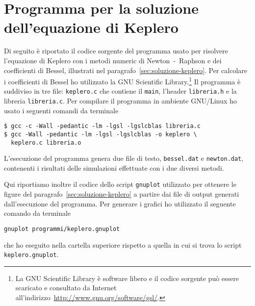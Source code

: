 \chapter{Programma per la soluzione dell'equazione di Keplero}
\label{cha:soluzione-keplero}

Di seguito è riportato il codice sorgente del programma usato per risolvere
l'equazione di Keplero con i metodi numeric di Newton~-~Raphson e dei
coefficienti di Bessel, illustrati nel
paragrafo~\ref{sec:soluzione-keplero}. Per calcolare i coefficienti di Bessel ho
utilizzato la GNU Scientific Library.\footnote{La GNU Scientific Library è
  software libero e il codice sorgente può essere scaricato e consultato da
  Internet all'indirizzo~\url{http://www.gnu.org/software/gsl/}.}  Il programma
è suddiviso in tre file: \verb|keplero.c| che contiene il \verb|main|, l'header
\verb|libreria.h| e la libreria \verb|libreria.c|. Per compilare il programma in
ambiente GNU/Linux ho usato i seguenti comandi da terminale
\begin{verbatim}
$ gcc -c -Wall -pedantic -lm -lgsl -lgslcblas libreria.c
$ gcc -Wall -pedantic -lm -lgsl -lgslcblas -o keplero \
  keplero.c libreria.o
\end{verbatim}
L'esecuzione del programma genera due file di testo, \verb|bessel.dat| e
\verb|newton.dat|, contenenti i risultati delle simulazioni effettuate con i due
diversi metodi.
% 

Qui riportiamo inoltre il codice dello script \verb|gnuplot| utilizzato per
ottenere le figure del paragrafo~\ref{sec:soluzione-keplero} a partire dai file
di output generati dall'esecuzione del programma. Per generare i grafici ho
utilizzato il seguente comando da terminale
\begin{verbatim}
gnuplot programmi/keplero.gnuplot
\end{verbatim}
che ho eseguito nella cartella superiore rispetto a quella in cui si trova lo
script \verb|keplero.gnuplot|.



